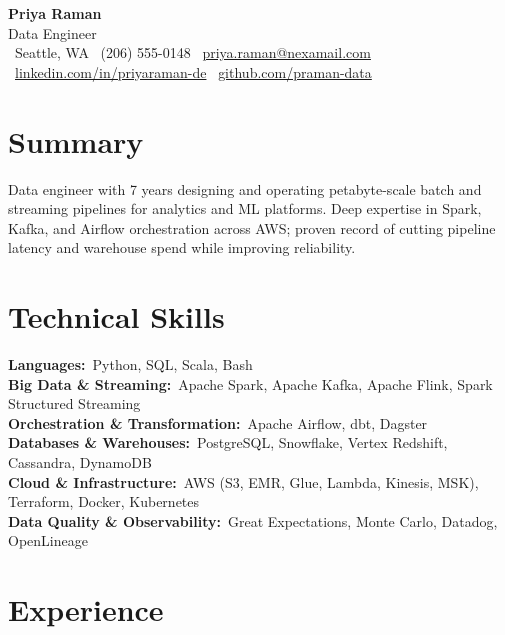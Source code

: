 \documentclass[10pt,letterpaper]{article}
\newcommand{\skillrow}[2]{%
  {\small\bfseries\color{inkNavy}#1:}~{\small #2}\\[1pt]
}
\begin{document}
\begin{center}
  {\Huge\bfseries\color{inkNavy} Priya Raman}\\[2pt]
  {\large\color{pipeTeal} Data Engineer}\\[3pt]
  {\small\color{slateGray}
    \faMapMarker\ Seattle, WA \quad\textbar\quad
    \faPhone\ (206) 555-0148 \quad\textbar\quad
    \faEnvelope\ \href{mailto:priya.raman@nexamail.com}{priya.raman@nexamail.com}\\[2pt]
    \faLinkedin\ \href{https://linkedin.com/in/priyaraman-de}{linkedin.com/in/priyaraman-de} \quad\textbar\quad
    \faGithub\ \href{https://github.com/praman-data}{github.com/praman-data}
  }
\end{center}
\vspace{-8pt}

\section{Summary}
\small
Data engineer with 7 years designing and operating petabyte-scale batch and streaming pipelines
for analytics and ML platforms. Deep expertise in Spark, Kafka, and Airflow orchestration across
AWS; proven record of cutting pipeline latency and warehouse spend while improving reliability.

\section{Technical Skills}
\skillrow{Languages}{Python, SQL, Scala, Bash}
\skillrow{Big Data \& Streaming}{Apache Spark, Apache Kafka, Apache Flink, Spark Structured Streaming}
\skillrow{Orchestration \& Transformation}{Apache Airflow, dbt, Dagster}
\skillrow{Databases \& Warehouses}{PostgreSQL, Snowflake, Vertex Redshift, Cassandra, DynamoDB}
\skillrow{Cloud \& Infrastructure}{AWS (S3, EMR, Glue, Lambda, Kinesis, MSK), Terraform, Docker, Kubernetes}
\skillrow{Data Quality \& Observability}{Great Expectations, Monte Carlo, Datadog, OpenLineage}

\section{Experience}
\end{document}

